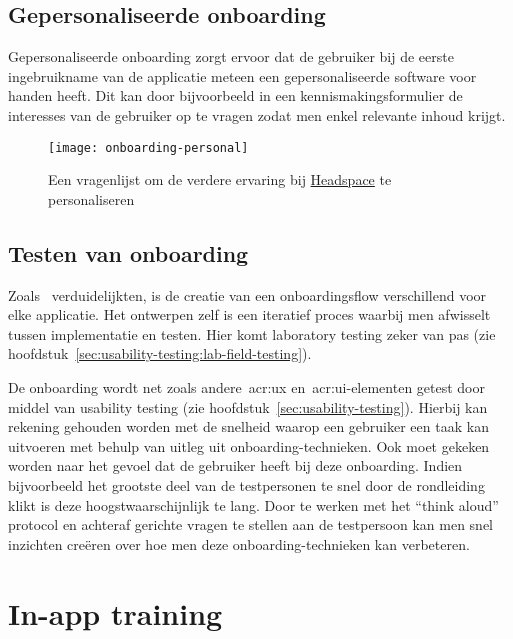 \subsection{Gepersonaliseerde onboarding}
\label{sec:onboarding:gepersonaliseerd}

Gepersonaliseerde onboarding zorgt ervoor dat de gebruiker bij de eerste ingebruikname van de applicatie meteen een gepersonaliseerde software voor handen heeft. Dit kan door bijvoorbeeld in een kennismakingsformulier de interesses van de gebruiker op te vragen zodat men enkel relevante inhoud krijgt.

\begin{figure}[h!]
    \centering
    \texttt{[image: onboarding-personal]}
    \caption[Voorbeeld gepersonaliseerde onboarding]{Een vragenlijst om de verdere ervaring bij \href{https://www.headspace.com/}{Headspace} te personaliseren}
    \label{fig:onboarding:gepersonaliseerd}
\end{figure}

\subsection{Testen van onboarding}
\label{sec:onboarding:testen}

Zoals~\textcite{Strahm2018} verduidelijkten, is de creatie van een onboardingsflow verschillend voor elke applicatie. Het ontwerpen zelf is een iteratief proces waarbij men afwisselt tussen implementatie en testen. Hier komt laboratory testing zeker van pas (zie hoofdstuk~\ref{sec:usability-testing:lab-field-testing}).

De onboarding wordt net zoals andere~\acrshort{acr:ux} en~\acrshort{acr:ui}-elementen getest door middel van usability testing (zie hoofdstuk~\ref{sec:usability-testing}). Hierbij kan rekening gehouden worden met de snelheid waarop een gebruiker een taak kan uitvoeren met behulp van uitleg uit onboarding-technieken. Ook moet gekeken worden naar het gevoel dat de gebruiker heeft bij deze onboarding. Indien bijvoorbeeld het grootste deel van de testpersonen te snel door de rondleiding klikt is deze hoogstwaarschijnlijk te lang. Door te werken met het ``think aloud'' protocol en achteraf gerichte vragen te stellen aan de testpersoon kan men snel inzichten creëren over hoe men deze onboarding-technieken kan verbeteren.

\section{In-app training}
\label{sec:in-app-training}

